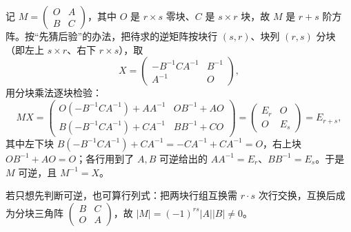 \begin{solution}
记 $M=\begin{pmatrix}O&A\\B&C\end{pmatrix}$，其中 $O$ 是 $r\times s$ 零块、$C$ 是 $s\times r$ 块，故 $M$ 是 $r+s$ 阶方阵。按“先猜后验”的办法，把待求的逆矩阵按块行 $(s,r)$、块列 $(r,s)$ 分块（即左上 $s\times r$、右下 $r\times s$），取
\[
X=\begin{pmatrix}-B^{-1}CA^{-1}&B^{-1}\\A^{-1}&O\end{pmatrix},
\]
用分块乘法逐块检验：
\[
MX=
\begin{pmatrix}
O(-B^{-1}CA^{-1})+AA^{-1} & OB^{-1}+AO\\[2pt]
B(-B^{-1}CA^{-1})+CA^{-1} & BB^{-1}+CO
\end{pmatrix}
=
\begin{pmatrix}E_r&O\\O&E_s\end{pmatrix}
=E_{r+s},
\]
其中左下块 $B(-B^{-1}CA^{-1})+CA^{-1}=-CA^{-1}+CA^{-1}=O$，右上块 $OB^{-1}+AO=O$；各行用到了 $A,B$ 可逆给出的 $AA^{-1}=E_r$、$BB^{-1}=E_s$。于是 $M$ 可逆，且 $M^{-1}=X$。

若只想先判断可逆，也可算行列式：把两块行组互换需 $r\cdot s$ 次行交换，互换后成为分块三角阵 $\begin{pmatrix}B&C\\O&A\end{pmatrix}$，故 $|M|=(-1)^{rs}|A||B|\ne0$。
\end{solution}

